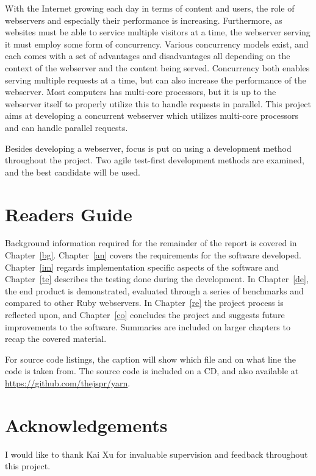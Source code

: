 %
With the Internet growing each day in terms of content and users, the role of
webservers and especially their performance is increasing. Furthermore, as
websites must be able to service multiple visitors at a time, the webserver
serving it must employ some form of concurrency. Various concurrency models
exist, and each comes with a set of advantages and disadvantages all
depending on the context of the webserver and the content being served.
Concurrency both enables serving multiple requests at a time, but can also
increase the performance of the webserver. Most computers has multi-core
processors, but it is up to the webserver itself to properly utilize this to
handle requests in parallel. This project aims at developing a concurrent
webserver which utilizes multi-core processors and can handle parallel
requests.

Besides developing a webserver, focus is put on using a development method
throughout the project. Two agile test-first development methods are examined,
and the best candidate will be used. 

\section{Readers Guide}
Background information required for the remainder of the report is covered in
Chapter~\ref{bg}. Chapter~\ref{an} covers the requirements for the software
developed. Chapter~\ref{im} regards implementation specific aspects of the
software and Chapter~\ref{te} describes the testing done during the
development. In Chapter~\ref{de}, the end product is demonstrated,
evaluated through a series of benchmarks and compared to other Ruby
webservers. In Chapter~\ref{re} the project process is reflected upon, and
Chapter~\ref{co} concludes the project and suggests future improvements to the
software. Summaries are included on larger chapters to recap the covered
material.

For source code listings, the caption will show which file and on what line
the code is taken from. The source code is included on a CD, and also
available at \url{https://github.com/thejspr/yarn}.

\section{Acknowledgements}
I would like to thank Kai Xu for invaluable supervision and feedback
throughout this project.
